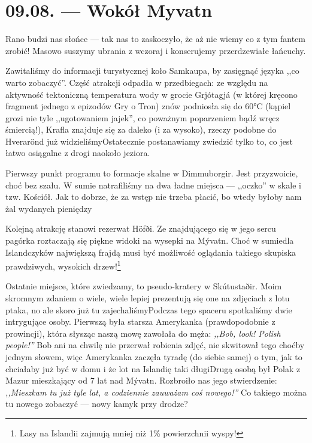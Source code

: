\chapter*{09.08. --- Wokół Myvatn}

Rano budzi nas słońce --- tak nas to zaskoczyło, że aż nie wiemy co z tym fantem zrobić! \wink Masowo suszymy ubrania z wczoraj i konserujemy przerdzewiałe łańcuchy.

Zawitaliśmy do informacji turystycznej koło Samkaupa, by zasięgnąć języka ,,co warto zobaczyć''. Część atrakcji odpadła w przedbiegach: ze względu na aktywność tektoniczną temperatura wody w grocie Grjótagjá (w której kręcono fragment jednego z epizodów Gry o Tron) znów podniosła się do 60°C (kąpiel grozi nie tyle ,,ugotowaniem jajek'', co poważnym poparzeniem bądź wręcz śmiercią!), Krafla znajduje się za daleko (i za wysoko\textellipsis), rzeczy podobne do Hverarönd już widzieliśmy\textellipsis Ostatecznie postanawiamy zwiedzić tylko to, co jest łatwo osiągalne z drogi naokoło jeziora.

Pierwszy punkt programu to formacje skalne w Dimmuborgir. Jest przyzwoicie, choć bez szału. W sumie natrafiliśmy na dwa ładne miejsca --- ,,oczko'' w skale i tzw. Kościół. Jak to dobrze, że za wstęp nie trzeba płacić, bo wtedy byłoby nam żal wydanych pieniędzy \wink


Kolejną atrakcję stanowi rezerwat Höfði. Ze znajdującego się w jego sercu pagórka roztaczają się piękne widoki na wysepki na Mývatn. Choć w sumie\textellipsis dla Islandczyków największą frajdą musi być możliwość oglądania takiego skupiska prawdziwych, wysokich drzew!\footnote{Lasy na Islandii zajmują mniej niż 1\% powierzchnii wyspy!}

Ostatnie miejsce, które zwiedzamy, to pseudo-kratery w Skútustaðir. Moim skromnym zdaniem o wiele, wiele lepiej prezentują się one na zdjęciach z lotu ptaka, no ale skoro już tu zajechaliśmy\textellipsis Podczas tego spaceru spotkaliśmy dwie intrygujące osoby. Pierwszą była starsza Amerykanka (prawdopodobnie z prowincji), która słysząc naszą mowę zawołała do męża: \emph{,,Bob, look! Polish people!''} Bob ani na chwilę nie przerwał robienia zdjęć, nie skwitował tego choćby jednym słowem, więc Amerykanka zaczęła tyradę (do siebie samej) o tym, jak to chciałaby już być w domu i że lot na Islandię taki długi\textellipsis Drugą osobą był Polak z Mazur mieszkający od 7 lat nad Mývatn. Rozbroiło nas jego stwierdzenie: \emph{,,Mieszkam tu już tyle lat, a codziennie zauważam coś nowego!''} Co takiego można tu nowego zobaczyć --- nowy kamyk przy drodze?

